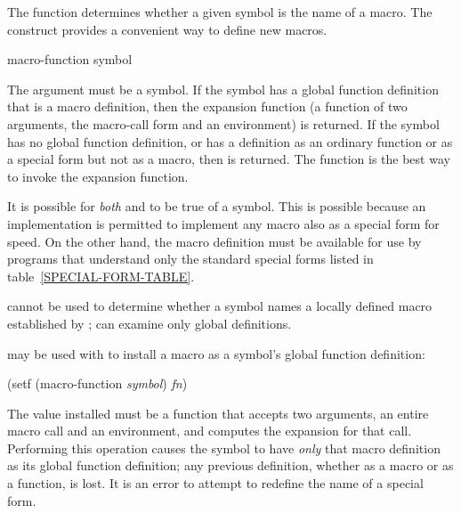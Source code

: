 The function  determines whether a given symbol
is the name of a macro.  The  construct provides
a convenient way to define new macros.

\begin{obsolete}
\begin{defun}[Function]
macro-function symbol

The argument must be a symbol.  If the symbol has a global function definition
that is a macro definition, then the expansion function
(a function of two arguments, the macro-call form and an environment)
is returned.
If the symbol has no global function definition, or has a definition
as an ordinary function or as a special form but not as a macro, then
{\false} is returned.  The function 
is the best way to invoke the expansion function.

It is possible for \emph{both}  and 
to be true of a symbol.  This is possible because an implementation is
permitted to implement any macro also as a special form for speed.
On the other hand, the macro definition must be available
for use by programs that understand only the standard special forms
listed in table~\ref{SPECIAL-FORM-TABLE}.

 cannot be used to determine whether a symbol names
a locally defined macro established by ;
 can
examine only global definitions.

 may be used with  to install
a macro as a symbol's global function definition:
\begin{lisp}
(setf (macro-function \emph{symbol}) \emph{fn})
\end{lisp}
The value installed must be a function that accepts two arguments,
an entire macro call and an environment, and computes the expansion for that call.
Performing this operation causes the symbol to have \emph{only} that
macro definition as its global function definition; any previous
definition, whether as a macro or as a function, is lost.
It is an error to attempt to redefine the name of a special
form.
\end{defun}
\end{obsolete}

